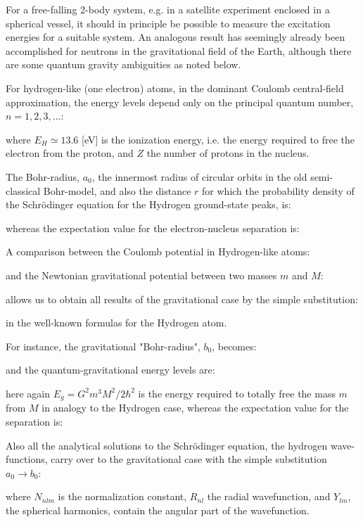 	For a free-falling 2-body system, e.g. in a satellite experiment enclosed in a spherical vessel, it should in principle be possible to measure the excitation energies for a suitable system. An analogous result has seemingly already been accomplished for neutrons in the gravitational field of the Earth, although there are some quantum gravity ambiguities as noted below.
	
	For hydrogen-like (one electron) atoms, in the dominant Coulomb central-field approximation, the energy levels depend only on the principal quantum number, $n = 1, 2, 3, ...$:
	
	where $E_H \simeq 13.6$ [eV] is the ionization energy, i.e. the energy required to free the electron from the proton, and $Z$ the number of protons in the nucleus.
	
	The Bohr-radius, $a_0$, the innermost radius of circular orbits in the old semi-classical Bohr-model, and also the distance $r$ for which the probability density of the Schrödinger equation for the Hydrogen ground-state peaks, is:
	
	whereas the expectation value for the electron-nucleus separation is:
	
	A comparison between the Coulomb potential in Hydrogen-like atoms:
	
	and the Newtonian gravitational potential between two masses $m$ and $M$:
	
	allows us to obtain all results of the gravitational case by the simple substitution:
	
	in the well-known formulas for the Hydrogen atom.
	
	For instance, the gravitational "Bohr-radius", $b_0$, becomes:
	
	and the quantum-gravitational energy levels are:
	
	here again $E_g = G^2 m^3 M^2/ 2 \hbar^2$ is the energy required to totally free the mass $m$ from $M$ in analogy to the Hydrogen case, whereas the expectation value for the separation is:
	
	Also all the analytical solutions to the Schrödinger equation, the hydrogen wave-functions, carry over to the gravitational case with the simple substitution $a_0 \rightarrow b_0$:
	
	where $N_{nlm}$ is the normalization constant, $R_{nl}$ the radial wavefunction, and $Y_{lm}$, the spherical harmonics, contain the angular part of the wavefunction.
	
